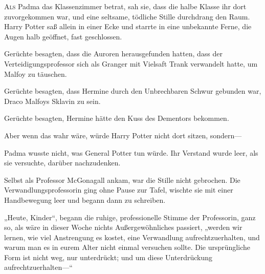 
\lettrine{A}{ls} Padma das Klassenzimmer betrat, sah sie, dass die halbe Klasse ihr dort zuvorgekommen war, und eine seltsame, tödliche Stille durchdrang den Raum. Harry Potter saß allein in einer Ecke und starrte in eine unbekannte Ferne, die Augen halb geöffnet, fast geschlossen.

Gerüchte besagten, dass die Auroren herausgefunden hatten, dass der Verteidigungsprofessor sich als Granger mit Vielsaft Trank verwandelt hatte, um Malfoy zu täuschen.

Gerüchte besagten, dass Hermine durch den Unbrechbaren Schwur gebunden war, Draco Malfoys Sklavin zu sein.

Gerüchte besagten, Hermine hätte den Kuss des Dementors bekommen.

Aber wenn das wahr wäre, würde Harry Potter nicht dort sitzen, sondern—

Padma wusste nicht, was General Potter tun würde. Ihr Verstand wurde leer, als sie versuchte, darüber nachzudenken.

Selbst als Professor McGonagall ankam, war die Stille nicht gebrochen. Die Verwandlungsprofessorin ging ohne Pause zur Tafel, wischte sie mit einer Handbewegung leer und begann dann zu schreiben.

„Heute, Kinder“, begann die ruhige, professionelle Stimme der Professorin, ganz so, als wäre in dieser Woche nichts Außergewöhnliches passiert, „werden wir lernen, wie viel Anstrengung es kostet, eine Verwandlung aufrechtzuerhalten, und warum man es in eurem Alter nicht einmal versuchen sollte. Die ursprüngliche Form ist nicht weg, nur unterdrückt; und um diese Unterdrückung aufrechtzuerhalten—“


